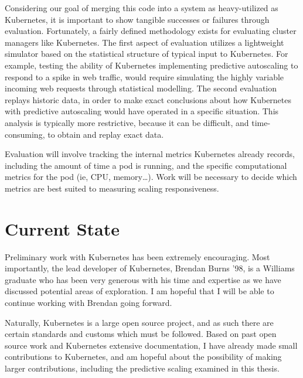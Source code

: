 \documentclass[letterpaper,11pt,twocolumn]{article}
\begin{document}
Considering our goal of merging this code into a system as heavy-utilized as
Kubernetes, it is important to show tangible successes or failures through
evaluation. Fortunately, a fairly defined methodology exists
for evaluating cluster managers like
Kubernetes.\cite[pg. 355]{omega} The first aspect of evaluation utilizes a
lightweight simulator based on the statistical structure of typical input to
Kubernetes. For example, testing the ability of Kubernetes implementing
predictive autoscaling to respond to a spike in web traffic,
would require simulating the highly variable incoming web requests through statistical
modelling. The second evaluation replays historic data, in order to make exact
conclusions about how Kubernetes with predictive autoscaling would have operated in a
specific situation. This analysis is typically more restrictive, because it can
be difficult, and time-consuming, to obtain and replay exact data.

Evaluation will involve tracking the internal metrics Kubernetes already
records, including the amount of time a pod is running, and the specific
computational metrics for the pod (ie, CPU, memory\dots). Work will be
necessary to decide which metrics are best suited to measuring scaling responsiveness.

\section{Current State}

Preliminary work with Kubernetes has been extremely encouraging. Most importantly,
the lead developer of Kubernetes, Brendan Burns '98, is a Williams graduate who has
been very generous with his time and expertise as we have discussed potential
areas of exploration. I am hopeful that I will be able to continue
working with Brendan going forward.

Naturally, Kubernetes is a large open source project, and as such there are
certain standards and customs which must be followed. Based on past open source
work and Kubernetes extensive documentation, I have already made small
contributions to Kubernetes, and am hopeful about the possibility of making
larger contributions, including the predictive scaling examined in this thesis.



\end{document}
